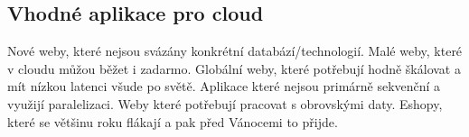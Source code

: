 \subsection{Vhodné aplikace pro cloud}
Nové weby, které nejsou svázány konkrétní databází/technologií. Malé weby, které v cloudu můžou běžet i zadarmo. Globální weby, které potřebují hodně škálovat a mít nízkou latenci všude po světě. Aplikace které nejsou primárně sekvenční a využijí paralelizaci. Weby které potřebují pracovat s obrovskými daty. Eshopy, které se většinu roku flákají a pak před Vánocemi to přijde.